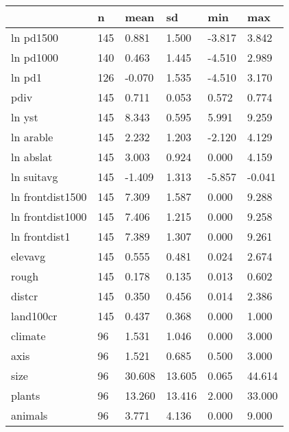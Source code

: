 \begin{table}[htbp]
\begin{tabular}{|l|l|l|l|l|l|}\hline  
 & n  & mean  & sd  & min  & max  \\ \hline  
ln pd1500 &       145 &     0.881 &     1.500 &    -3.817 &     3.842 \\ \hline 
ln pd1000 &       140 &     0.463 &     1.445 &    -4.510 &     2.989 \\ \hline 
ln pd1 &       126 &    -0.070 &     1.535 &    -4.510 &     3.170 \\ \hline 
pdiv &       145 &     0.711 &     0.053 &     0.572 &     0.774 \\ \hline 
ln yst &       145 &     8.343 &     0.595 &     5.991 &     9.259 \\ \hline 
ln arable &       145 &     2.232 &     1.203 &    -2.120 &     4.129 \\ \hline 
ln abslat &       145 &     3.003 &     0.924 &     0.000 &     4.159 \\ \hline 
ln suitavg &       145 &    -1.409 &     1.313 &    -5.857 &    -0.041 \\ \hline 
ln frontdist1500 &       145 &     7.309 &     1.587 &     0.000 &     9.288 \\ \hline 
ln frontdist1000 &       145 &     7.406 &     1.215 &     0.000 &     9.258 \\ \hline 
ln frontdist1 &       145 &     7.389 &     1.307 &     0.000 &     9.261 \\ \hline 
elevavg &       145 &     0.555 &     0.481 &     0.024 &     2.674 \\ \hline 
rough &       145 &     0.178 &     0.135 &     0.013 &     0.602 \\ \hline 
distcr &       145 &     0.350 &     0.456 &     0.014 &     2.386 \\ \hline 
land100cr &       145 &     0.437 &     0.368 &     0.000 &     1.000 \\ \hline 
climate &        96 &     1.531 &     1.046 &     0.000 &     3.000 \\ \hline 
axis &        96 &     1.521 &     0.685 &     0.500 &     3.000 \\ \hline 
size &        96 &    30.608 &    13.605 &     0.065 &    44.614 \\ \hline 
plants &        96 &    13.260 &    13.416 &     2.000 &    33.000 \\ \hline 
animals &        96 &     3.771 &     4.136 &     0.000 &     9.000 \\ \hline 

\end{tabular}
\end{table}
